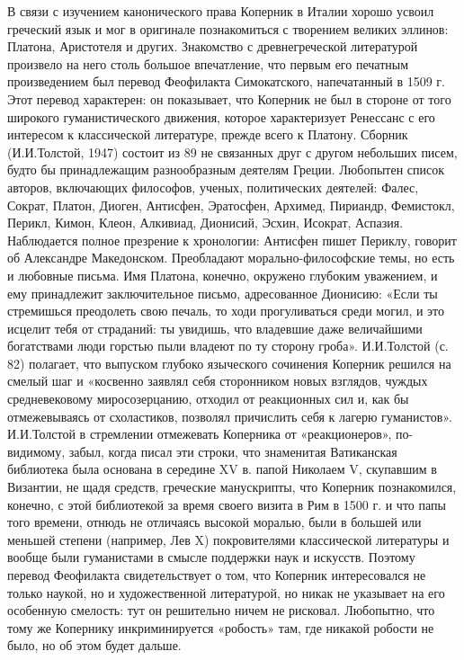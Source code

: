 В   связи  с   изучением   канонического  права   Коперник  в   Италии
хорошо  усвоил  греческий  язык  и мог  в  оригинале  познакомиться  с
творением великих  эллинов: Платона,  Аристотеля и  других. Знакомство
с  древнегреческой   литературой  произвело  на  него   столь  большое
впечатление,  что  первым  его   печатным  произведением  был  перевод
Феофилакта  Симокатского,   напечатанный  в   1509  г.   Этот  перевод
характерен:  он показывает,  что Коперник  не  был в  стороне от  того
широкого гуманистического движения,  которое характеризует Ренессанс с
его  интересом  к классической  литературе,  прежде  всего к  Платону.
Сборник (И.И.Толстой, 1947)  состоит из 89 не связанных  друг с другом
небольших писем, будто бы принадлежащим разнообразным деятелям Греции.
Любопытен список  авторов, включающих философов,  ученых, политических
деятелей: Фалес, Сократ, Платон, Диоген, Антисфен, Эратосфен, Архимед,
Пириандр,  Фемистокл,   Перикл,  Кимон,  Клеон,   Алкивиад,  Дионисий,
Эсхин, Исократ,  Аспазия. Наблюдается  полное презрение  к хронологии:
Антисфен пишет Периклу, говорит об Александре Македонском. Преобладают
морально-философские  темы, но  есть и  любовные письма.  Имя Платона,
конечно, окружено глубоким уважением, и ему принадлежит заключительное
письмо,  адресованное Дионисию:  «Если ты  стремишься преодолеть  свою
печаль,  то ходи  прогуливаться среди  могил,  и это  исцелит тебя  от
страданий: ты увидишь, что владевшие даже величайшими богатствами люди
горстью  пыли  владеют  по  ту сторону  гроба».  И.И.Толстой  (с.  82)
полагает, что  выпуском глубоко языческого сочинения  Коперник решился
на смелый  шаг и  «косвенно заявлял  себя сторонником  новых взглядов,
чуждых средневековому  миросозерцанию, отходил  от реакционных  сил и,
как  бы  отмежевываясь  от  схоластиков, позволял  причислить  себя  к
лагерю гуманистов».  И.И.Толстой в стремлении отмежевать  Коперника от
«реакционеров»,  по-видимому,  забыл,  когда  писал  эти  строки,  что
знаменитая  Ватиканская  библиотека была  основана  в  середине XV  в.
папой Николаем  V, скупавшим  в Византии,  не щадя  средств, греческие
манускрипты, что Коперник познакомился, конечно, с этой библиотекой за
время своего визита  в Рим в 1500  г. и что папы  того времени, отнюдь
не  отличаясь высокой  моралью,  были в  большей  или меньшей  степени
(например, Лев X) покровителями  классической литературы и вообще были
гуманистами  в  смысле  поддержки  наук и  искусств.  Поэтому  перевод
Феофилакта свидетельствует о том, что Коперник интересовался не только
наукой, но и художественной литературой,  но никак не указывает на его
особенную смелость:  тут он  решительно ничем не  рисковал. Любопытно,
что  тому  же Копернику  инкриминируется  «робость»  там, где  никакой
робости не было, но об этом будет дальше.

